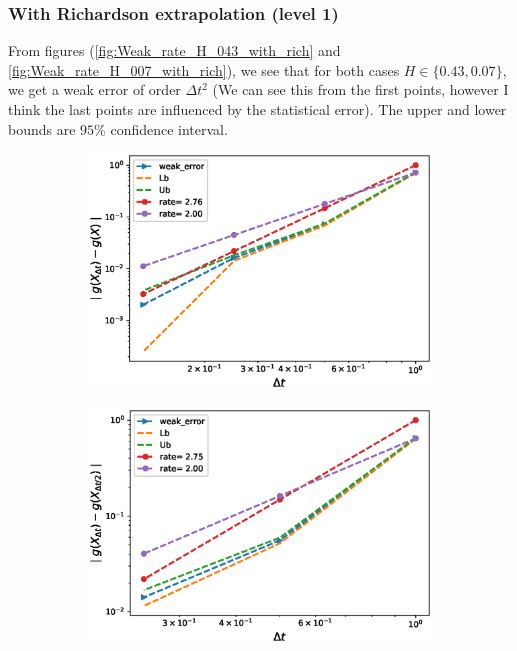 \documentclass[11pt]{article}
\begin{document}
\subsubsection*{With Richardson extrapolation (level 1)}
From figures (\ref{fig:Weak_rate_H_043_with_rich} and \ref{fig:Weak_rate_H_007_with_rich}), we see that for both cases $H \in \{0.43,0.07\}$, we get a weak error of order $\Delta t^2$ (We can see this from the first points, however I think the last points are influenced by the statistical error). The upper and lower bounds are $95\%$ confidence interval.
\begin{figure}[h!]
	\centering
	\begin{subfigure}{.4\textwidth}
		\centering
		\includegraphics[width=1\linewidth]{./figures/rBergomi_weak_error_rates/with_richardson/H_043/weak_convergence_order_Bergomi_H_043_K_1_M_10_6_CI_richardson_relative}
		\caption{}
		\label{fig:sub3}
	\end{subfigure}%
	\begin{subfigure}{.4\textwidth}
		\centering
		\includegraphics[width=1\linewidth]{./figures/rBergomi_weak_error_rates/with_richardson/H_043/weak_convergence_order_differences_Bergomi_H_043_K_1_M_10_6_CI_richardson_relative}
		\caption{}
		\label{fig:sub4}
	\end{subfigure}
	

\end{figure}
\end{document}
